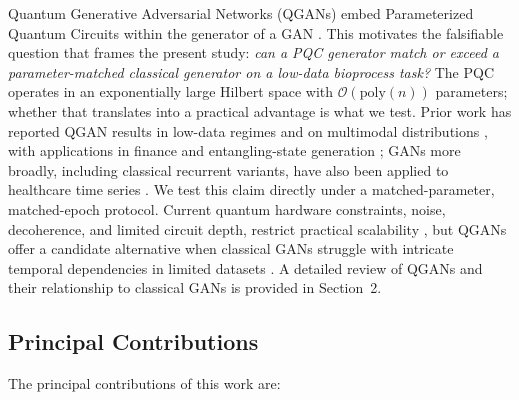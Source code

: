 \documentclass[12pt,twocolumn]{article}
\begin{document}
Quantum Generative Adversarial Networks (QGANs) embed Parameterized Quantum Circuits within the generator of a GAN \cite{Dallaire_Demers_2018, Lloyd_2018, Zoufal_2019}. This motivates the falsifiable question that frames the present study: \emph{can a PQC generator match or exceed a parameter-matched classical generator on a low-data bioprocess task?} The PQC operates in an exponentially large Hilbert space with $\mathcal{O}(\mathrm{poly}(n))$ parameters; whether that translates into a practical advantage is what we test. Prior work has reported QGAN results in low-data regimes and on multimodal distributions \cite{rudolph2022generationhighresolutionhandwrittendigits, he2025qganbaseddataaugmentationhybrid}, with applications in finance \cite{orlandi2024enhancing} and entangling-state generation \cite{niu2022entangling}; GANs more broadly, including classical recurrent variants, have also been applied to healthcare time series \cite{esteban2017realvaluedmedicaltimeseries}. We test this claim directly under a matched-parameter, matched-epoch protocol. Current quantum hardware constraints, noise, decoherence, and limited circuit depth, restrict practical scalability \cite{Cerezo_2021}, but QGANs offer a candidate alternative when classical GANs struggle with intricate temporal dependencies in limited datasets \cite{goodfellow2014generativeadversarialnetworks, lloyd2013quantumalgorithmssupervisedunsupervised}. A detailed review of QGANs and their relationship to classical GANs is provided in Section~2.


\subsection{Principal Contributions}

The principal contributions of this work are:
\end{document}
